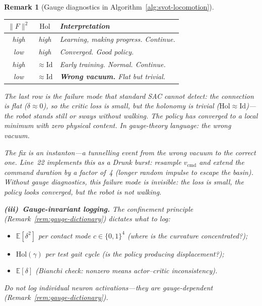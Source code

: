 \documentclass[11pt,a4paper]{article}
\newtheorem{remark}[theorem]{Remark}
\newcommand{\norm}[1]{\lVert #1 \rVert}
\begin{document}
\begin{remark}[Gauge diagnostics in
  Algorithm~\ref{alg:svot-locomotion}]
\smallskip
\begin{center}
\small
\begin{tabular}{@{}ccl@{}}
\toprule
$\norm{F}^2$ & $\mathrm{Hol}$
  & \textbf{Interpretation} \\
\midrule
high & high
  & Learning, making progress. Continue. \\
low  & high
  & Converged. Good policy. \\
high & $\approx \mathrm{Id}$
  & Early training. Normal. Continue. \\
low  & $\approx \mathrm{Id}$
  & \textbf{Wrong vacuum.}
    Flat but trivial. \\
\bottomrule
\end{tabular}
\end{center}

\smallskip\noindent
The last row is the failure mode that standard SAC
cannot detect:
the connection is flat ($\delta \approx 0$),
so the critic loss is small,
but the holonomy is trivial
($\mathrm{Hol} \approx \mathrm{Id}$)---the
robot stands still or sways without walking.
The policy has converged to a
\emph{local minimum with zero physical content}.
In gauge-theory language: the \emph{wrong vacuum}.

The fix is an \emph{instanton}---a tunnelling event
from the wrong vacuum to the correct one.
Line~22 implements this as a Drunk burst:
resample $v_{\mathrm{cmd}}$ and extend the
command duration by a factor of~4
(longer random impulse to escape the basin).
Without gauge diagnostics, this failure mode
is invisible: the loss is small,
the policy looks converged,
but the robot is not walking.

\medskip\noindent
\textbf{(iii)\ Gauge-invariant logging.}\;
The confinement principle
(Remark~\ref{rem:gauge-dictionary})
dictates what to log:
\begin{itemize}[nosep]
\item $\mathbb{E}[\delta^2]$ per contact mode
  $c \in \{0,1\}^4$
  (where is the curvature concentrated?);
\item $\mathrm{Hol}(\gamma)$ per test gait cycle
  (is the policy producing displacement?);
\item $\mathbb{E}[\delta]$
  (Bianchi check:
   nonzero means actor--critic inconsistency).
\end{itemize}
Do \emph{not} log individual neuron activations---they
are gauge-dependent
(Remark~\ref{rem:gauge-dictionary}).
\end{remark}
\end{document}
